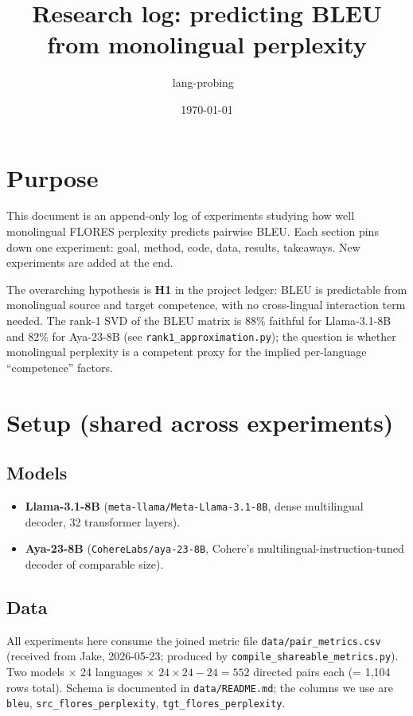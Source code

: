 \documentclass[11pt]{article}
\title{Research log: predicting BLEU from monolingual perplexity}
\author{lang-probing \,\textbar\, \code{experiments/perplexity\_bleu\_linear/}}
\date{\today}
\newcommand{\code}[1]{\texttt{\small #1}}
\begin{document}
\maketitle

\section*{Purpose}

This document is an append-only log of experiments studying how well
monolingual FLORES perplexity predicts pairwise BLEU. Each section pins down
one experiment: goal, method, code, data, results, takeaways. New
experiments are added at the end.

The overarching hypothesis is \textbf{H1} in the project ledger: BLEU is
predictable from monolingual source and target competence, with no
cross-lingual interaction term needed. The rank-1 SVD of the BLEU matrix is
$88\%$ faithful for Llama-3.1-8B and $82\%$ for Aya-23-8B (see
\code{rank1\_approximation.py}); the question is whether monolingual
perplexity is a competent proxy for the implied per-language ``competence''
factors.

\section{Setup (shared across experiments)}

\subsection{Models}

\begin{itemize}
  \item \textbf{Llama-3.1-8B} (\code{meta-llama/Meta-Llama-3.1-8B}, dense
    multilingual decoder, 32 transformer layers).
  \item \textbf{Aya-23-8B} (\code{CohereLabs/aya-23-8B}, Cohere's
    multilingual-instruction-tuned decoder of comparable size).
\end{itemize}

\subsection{Data}

All experiments here consume the joined metric file
\code{data/pair\_metrics.csv} (received from Jake, 2026-05-23; produced by
\code{compile\_shareable\_metrics.py}). Two models $\times$ 24 languages
$\times$ $24\times24 - 24 = 552$ directed pairs each (= 1{,}104 rows total).
Schema is documented in \code{data/README.md}; the columns we use are
\code{bleu}, \code{src\_flores\_perplexity}, \code{tgt\_flores\_perplexity}.
\end{document}
